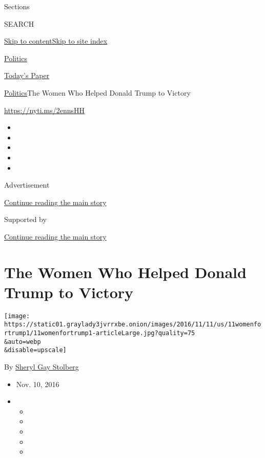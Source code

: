 Sections

SEARCH

\protect\hyperlink{site-content}{Skip to
content}\protect\hyperlink{site-index}{Skip to site index}

\href{https://www.nytimes3xbfgragh.onion/section/politics}{Politics}

\href{https://myaccount.nytimes3xbfgragh.onion/auth/login?response_type=cookie\&client_id=vi}{}

\href{https://www.nytimes3xbfgragh.onion/section/todayspaper}{Today's
Paper}

\href{/section/politics}{Politics}\textbar{}The Women Who Helped Donald
Trump to Victory

\url{https://nyti.ms/2ennsHH}

\begin{itemize}
\item
\item
\item
\item
\item
\end{itemize}

Advertisement

\protect\hyperlink{after-top}{Continue reading the main story}

Supported by

\protect\hyperlink{after-sponsor}{Continue reading the main story}

\hypertarget{the-women-who-helped-donald-trump-to-victory}{%
\section{The Women Who Helped Donald Trump to
Victory}\label{the-women-who-helped-donald-trump-to-victory}}

\texttt{[image: https://static01.graylady3jvrrxbe.onion/images/2016/11/11/us/11womenfortrump1/11womenfortrump1-articleLarge.jpg?quality=75\\\&auto=webp\\\&disable=upscale]}

By
\href{http://www.nytimes3xbfgragh.onion/by/sheryl-gay-stolberg}{Sheryl
Gay Stolberg}

\begin{itemize}
\item
  Nov. 10, 2016
\item
  \begin{itemize}
  \item
  \item
  \item
  \item
  \item
  \end{itemize}
\end{itemize}

